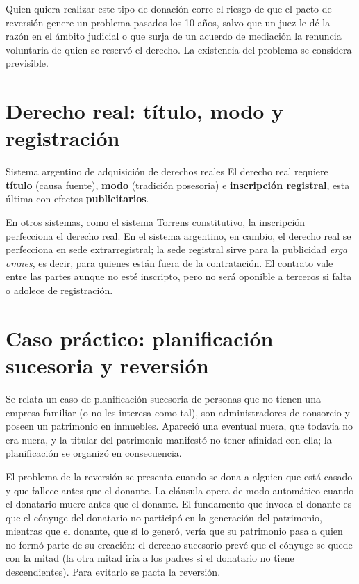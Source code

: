 \documentclass[12pt,oneside]{book}
\begin{document}
Quien quiera realizar este tipo de donación corre el riesgo de que el pacto de reversión genere un problema pasados los 10 años, salvo que un juez le dé la razón en el ámbito judicial o que surja de un acuerdo de mediación la renuncia voluntaria de quien se reservó el derecho. La existencia del problema se considera previsible.

\section{Derecho real: título, modo y registración}

\begin{definition}{Sistema argentino de adquisición de derechos reales}
El derecho real requiere \textbf{título} (causa fuente), \textbf{modo} (tradición posesoria) e \textbf{inscripción registral}, esta última con efectos \textbf{publicitarios}.
\end{definition}

En otros sistemas, como el sistema Torrens constitutivo, la inscripción perfecciona el derecho real. En el sistema argentino, en cambio, el derecho real se perfecciona en sede extrarregistral; la sede registral sirve para la publicidad \textit{erga omnes}, es decir, para quienes están fuera de la contratación. El contrato vale entre las partes aunque no esté inscripto, pero no será oponible a terceros si falta o adolece de registración.

\section{Caso práctico: planificación sucesoria y reversión}

Se relata un caso de planificación sucesoria de personas que no tienen una empresa familiar (o no les interesa como tal), son administradores de consorcio y poseen un patrimonio en inmuebles. Apareció una eventual nuera, que todavía no era nuera, y la titular del patrimonio manifestó no tener afinidad con ella; la planificación se organizó en consecuencia.

El problema de la reversión se presenta cuando se dona a alguien que está casado y que fallece antes que el donante. La cláusula opera de modo automático cuando el donatario muere antes que el donante. El fundamento que invoca el donante es que el cónyuge del donatario no participó en la generación del patrimonio, mientras que el donante, que sí lo generó, vería que su patrimonio pasa a quien no formó parte de su creación: el derecho sucesorio prevé que el cónyuge se quede con la mitad (la otra mitad iría a los padres si el donatario no tiene descendientes). Para evitarlo se pacta la reversión.
\end{document}
